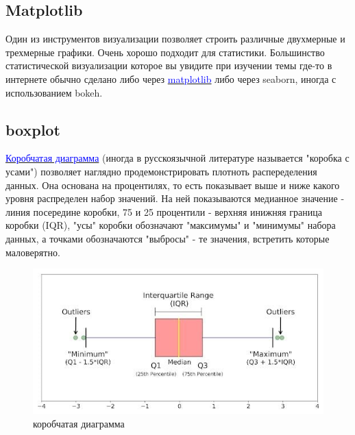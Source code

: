 \documentclass[12pt, a4paper]{article}
\begin{document}
{\subsection{Matplotlib}

Один из инструментов визуализации позволяет строить различные 
двухмерные и трехмерные графики. Очень хорошо подходит для 
статистики. Большинство статистической визуализации которое 
вы увидите при изучении темы где-то в интернете обычно 
сделано либо через 
\href{https://matplotlib.org/}{\textcolor{blue}{matplotlib}} 
либо через seaborn, иногда с 
использованием bokeh.

\subsection{boxplot}

\href{https://builtin.com/data-science/boxplot}
{\textcolor{blue}{Коробчатая диаграмма}} (иногда в русскоязычной 
литературе называется "коробка с усами") позволяет наглядно 
продемонстрировать плотноть распеределения данных. Она 
основана на процентилях, то есть показывает выше и 
ниже какого уровня распределен набор значений. На ней 
показываются медианное значение - линия посередине коробки, 
75 и 25 процентили - верхняя инижняя граница коробки (IQR), 
"усы" коробки обозначают "максимумы" и "минимумы" набора 
данных, а точками обозначаются "выбросы" - те значения, 
встретить которые маловерятно.

\begin{figure}[h]
    \begin{center}
        \includegraphics[scale=0.75,keepaspectratio]
        {Pictures/Picture_8.jpg}
        \caption{коробчатая диаграмма}
        \label{Picture_8}
    \end{center}
\end{figure}

\newpage

}
\end{document}
